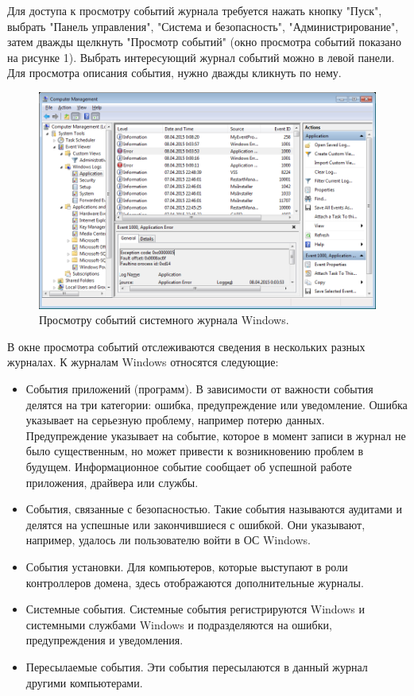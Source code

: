 \documentclass[a4paper, 12pt]{report}		%
\begin{document}
Для доступа к просмотру событий журнала требуется нажать кнопку "Пуск", выбрать "Панель управления", "Система и безопасность", "Администрирование", затем дважды щелкнуть "Просмотр событий" (окно просмотра событий показано на рисунке 1).‌ Выбрать интересующий журнал событий можно в левой панели. Для просмотра описания события, нужно дважды кликнуть по нему.

\begin{figure}[h!]
\centering
\includegraphics[scale=0.75]{res/managment}
\caption{Просмотру событий системного журнала Windows.}
\end{figure}

В окне просмотра событий отслеживаются сведения в нескольких разных журналах. К журналам Windows относятся следующие:
\begin{itemize}
\item События приложений (программ). В зависимости от важности события делятся на три категории: ошибка, предупреждение или уведомление. Ошибка указывает на серьезную проблему, например потерю данных. Предупреждение указывает на событие, которое в момент записи в журнал не было существенным, но может привести к возникновению проблем в будущем. Информационное событие сообщает об успешной работе приложения, драйвера или службы.
\item События, связанные с безопасностью. Такие события называются аудитами и делятся на успешные или закончившиеся с ошибкой. Они указывают, например, удалось ли пользователю войти в ОС Windows.
\item События установки. Для компьютеров, которые выступают в роли контроллеров домена, здесь отображаются дополнительные журналы.
\item Системные события. Системные события регистрируются Windows и системными службами Windows и подразделяются на ошибки, предупреждения и уведомления.
\item Пересылаемые события. Эти события пересылаются в данный журнал другими компьютерами.
\end{itemize}
\end{document}
